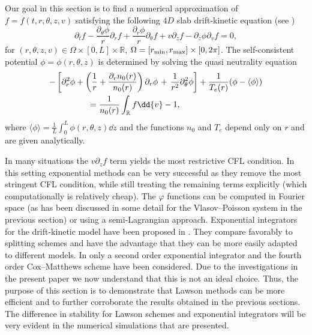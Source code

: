 Our goal in this section is to find a numerical approximation of $f=f(t,r,\theta,z,v)$ satisfying the following $4D$ slab drift-kinetic equation (see \cite{Grandgirard:2006})
\begin{equation}
  \label{dk}
  \partial_tf-\frac{\partial_\theta \phi}{r}\partial_rf+\frac{\partial_r \phi}{r}\partial_\theta f + v\partial_zf-\partial_z\phi\partial_{v}f = 0,
\end{equation}
for $(r,\theta,z,v)\in \Omega\times[0,L]\times \mathbb{R}$, $\Omega=[r_{\rm min},r_{\rm max}]\times [0, 2\pi]$. The self-consistent potential $\phi=\phi(r,\theta,z)$ is determined by solving the quasi neutrality equation
\begin{align}
  -\left[\partial_r^2\phi+\left(\frac{1}{r}+\frac{\partial_r n_0(r)}{n_0(r)}\right)\partial_r\phi \right.&+\left.\frac{1}{r^2}\partial_\theta^2\phi\right]+\frac{1}{T_e(r)}(\phi-\langle\phi\rangle)\nonumber\\
  \label{qn}
  &\hspace{-3cm}=\frac{1}{n_0(r)}\int_{\mathbb{R}} f\dd{v}-1,
\end{align}
where $\langle\phi\rangle = \frac{1}{L}\int_0^L \phi(r,\theta,z)\dd{z}$ and the functions $n_0$ and $T_e$ depend only on $r$ and are given analytically.

In many situations the $v \partial_z f$ term yields the most restrictive CFL condition. In this setting exponential methods can be very successful as they remove the most stringent CFL condition, while still treating the remaining terms explicitly (which computationally is relatively cheap). The $\varphi$ functions can be computed in Fourier space (as has been discussed in some detail for the Vlasov--Poisson system in the previous section) or using a semi-Lagrangian approach. Exponential integrators for the drift-kinetic model have been proposed in \cite{Crouseilles:2018}. They compare favorably to splitting schemes and have the advantage that they can be more easily adapted to different models. In \cite{Crouseilles:2018} only a second order exponential integrator and the fourth order Cox--Matthews scheme have been considered. Due to the investigations in the present paper we now understand that this is not an ideal choice. Thus, the purpose of this section is to demonstrate that Lawson methods can be more efficient and to further corroborate the results obtained in the previous sections. The difference in stability for Lawson schemes and exponential integrators will be very evident in the numerical simulations that are presented.

